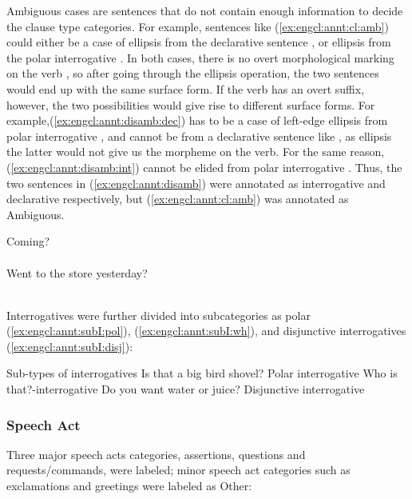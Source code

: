 Ambiguous cases are sentences that do not contain enough information to decide the clause type categories. For example, sentences like (\ref{ex:engcl:annt:cl:amb}) could either be a case of ellipsis from the declarative sentence , or ellipsis from the polar interrogative . In both cases, there is no overt morphological marking on the verb , so after going through the ellipsis operation, the two sentences would end up with the same surface form. If the verb has an overt suffix, however, the two possibilities would give rise to different surface forms. For example,(\ref{ex:engcl:annt:disamb:dec}) has to be a case of left-edge ellipsis from polar interrogative , and cannot be from a declarative sentence like , as ellipsis the latter would not give us the  morpheme on the verb. For the same reason, (\ref{ex:engcl:annt:disamb:int}) cannot be elided from polar interrogative . Thus, the two sentences in (\ref{ex:engcl:annt:disamb}) were annotated as interrogative and declarative respectively, but (\ref{ex:engcl:annt:cl:amb}) was annotated as Ambiguous.

\bxl\label{ex:engcl:annt:disamb:dec} Coming? \\
\cmark {}\\
\xmark {}
\ex \label{ex:engcl:annt:disamb:int} Went to the store yesterday? \\
\cmark {}\\
\xmark {}
\exl
\eex

Interrogatives were further divided into subcategories as polar (\ref{ex:engcl:annt:subI:pol}), \twh{} (\ref{ex:engcl:annt:subI:wh}), and disjunctive interrogatives (\ref{ex:engcl:annt:subI:disj}):

	Sub-types of interrogatives
\bxl\label{ex:engcl:annt:subI:pol}
Is that a big bird shovel? \hfill	Polar interrogative
\ex\label{ex:engcl:annt:subI:wh}	Who is that?\hfill	\twh-interrogative
\ex\label{ex:engcl:annt:subI:disj}	Do you want water or juice? \hfill Disjunctive interrogative
\exl
\eex

\subsubsection{Speech Act}

Three major speech acts categories, assertions, questions and requests/commands, were labeled;%
minor speech act categories such as exclamations and greetings were labeled as Other:

